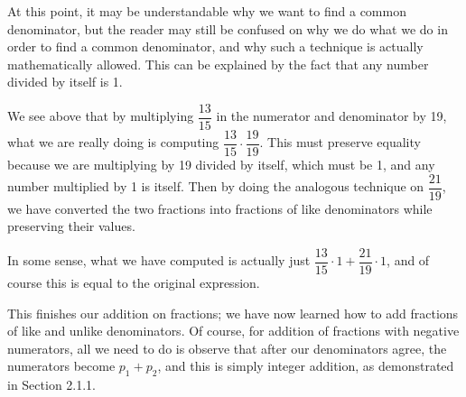 \documentclass[openany]{book}
\begin{document}
\begin{remark}
	At this point, it may be understandable why we want to find a common denominator, but the reader may still be confused on why we do what we do in order to find a common denominator, and why such a technique is actually mathematically allowed. This can be explained by the fact that any number divided by itself is 1.\par
	We see above that by multiplying $\dfrac{13}{15}$ in the numerator and denominator by 19, what we are really doing is computing $\dfrac{13}{15}\cdot\dfrac{19}{19}$. This must preserve equality because we are multiplying by 19 divided by itself, which must be 1, and any number multiplied by 1 is itself. Then by doing the analogous technique on $\dfrac{21}{19}$, we have converted the two fractions into fractions of like denominators while preserving their values.\par
	In some sense, what we have computed is actually just $\dfrac{13}{15}\cdot1+\dfrac{21}{19}\cdot1$, and of course this is equal to the original expression.
\end{remark}
This finishes our addition on fractions; we have now learned how to add fractions of like and unlike denominators. Of course, for addition of fractions with negative numerators, all we need to do is observe that after our denominators agree, the numerators become $p_{1}+p_{2}$, and this is simply integer addition, as demonstrated in Section 2.1.1.
\end{document}
